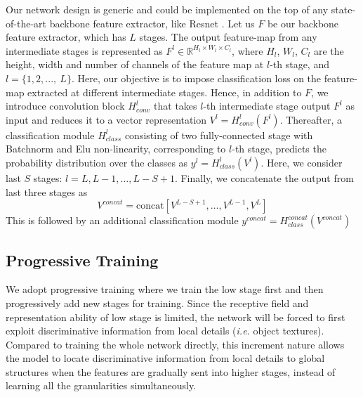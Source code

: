 \documentclass{llncs}
\begin{document}
Our network design is generic and could be implemented on the top of any state-of-the-art backbone feature extractor, like Resnet \cite{he2016deep}. Let us ${F}$ be our backbone feature extractor, which has $L$ stages. The output feature-map from any intermediate stages is represented as ${F}^{l} \in  \mathbb{R}^{H_{l} \times W_{l} \times C_{l}}$, where $H_{l}$, $W_{l}$, $C_{l}$ are the height, width and number of channels of the feature map at $l$-th stage, and $l=\{1,2, ...,~L\}$. Here, our objective is to impose classification loss on the feature-map extracted at different intermediate stages. Hence, in addition to ${F}$, we introduce convolution block ${H}_{conv}^{l}$ that takes $l$-th intermediate stage output ${F}^{l}$ as input and reduces it to a vector representation ${V}^{l} = {H}_{conv}^{l}({F}^{l})$. Thereafter, a classification module ${H}_{class}^{l}$ consisting of two fully-connected stage with Batchnorm \cite{ioffe2015batch} and Elu\cite{clevert2015fast} non-linearity, corresponding to $l$-th stage, predicts the probability distribution over the classes as $y^{l} = {H}_{class}^{l}({V}^{l})$. Here, we consider last $S$ stages: $l = L, L-1, \dotsc, L-S+1$. Finally, we concatenate the output from last three stages as 
\begin{equation}
{V}^{concat} = \text{concat}[{V}^{L-S+1}, \dotsc, {V}^{L-1}, {V}^{L}]  
\end{equation}
 This is followed by an additional classification module  $y^{concat} = {H}_{class}^{concat}({V}^{concat})$









\subsection{Progressive Training}

We adopt progressive training where we train the low stage first and then progressively add new stages for training. Since the receptive field and representation ability of low stage is limited, the network will be forced to first exploit discriminative information from local details ({\em i.e.} object textures). Compared to training the whole network directly, this increment nature allows the model to locate discriminative information from local details to global structures when the features are gradually sent into higher stages, instead of learning all the granularities simultaneously.
\end{document}
